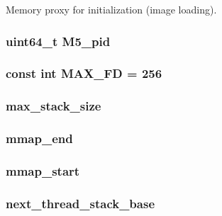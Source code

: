 Memory proxy for initialization (image loading). \hypertarget{classProcess_a570045a30dc7f4c596f2fa18dfdfbed5}{
\subsubsection[{M5\_\-pid}]{\setlength{\rightskip}{0pt plus 5cm}uint64\_\-t {\bf M5\_\-pid}}}
\label{classProcess_a570045a30dc7f4c596f2fa18dfdfbed5}
\hypertarget{classProcess_a2a18c1a4811677d6adabab2287226bb1}{
\subsubsection[{MAX\_\-FD}]{\setlength{\rightskip}{0pt plus 5cm}const int {\bf MAX\_\-FD} = 256}}
\label{classProcess_a2a18c1a4811677d6adabab2287226bb1}
\hypertarget{classProcess_a02d0240a7f8b3d791b54cd01f9370121}{
\subsubsection[{max\_\-stack\_\-size}]{ {\bf max\_\-stack\_\-size}}}
\label{classProcess_a02d0240a7f8b3d791b54cd01f9370121}
\hypertarget{classProcess_a41a18edd0dbae5a7bb12e20a30c2e3e1}{
\subsubsection[{mmap\_\-end}]{ {\bf mmap\_\-end}}}
\label{classProcess_a41a18edd0dbae5a7bb12e20a30c2e3e1}
\hypertarget{classProcess_a39ba573f8e6f0a0f33a82245af695ffc}{
\subsubsection[{mmap\_\-start}]{ {\bf mmap\_\-start}}}
\label{classProcess_a39ba573f8e6f0a0f33a82245af695ffc}
\hypertarget{classProcess_a55a3705006af6c58cba9f9a23ba89864}{
\subsubsection[{next\_\-thread\_\-stack\_\-base}]{ {\bf next\_\-thread\_\-stack\_\-base}}}
